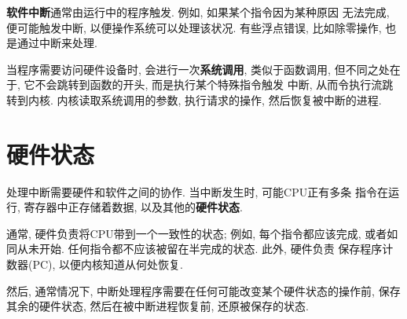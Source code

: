 \documentclass[12pt]{book}
\begin{document}
{%
{\bf 软件中断}通常由运行中的程序触发. 例如, 如果某个指令因为某种原因
无法完成, 便可能触发中断, 以便操作系统可以处理该状况. 有些浮点错误, 
比如除零操作, 也是通过中断来处理. 

当程序需要访问硬件设备时, 会进行一次{\bf 系统调用}, 类似于函数调用, 
但不同之处在于, 它不会跳转到函数的开头, 而是执行某个特殊指令触发
中断, 从而令执行流跳转到内核. 内核读取系统调用的参数, 执行请求的操作, 
然后恢复被中断的进程.


\section{硬件状态}

处理中断需要硬件和软件之间的协作. 当中断发生时, 可能CPU正有多条
指令在运行, 寄存器中正存储着数据, 以及其他的{\bf 硬件状态}.

通常, 硬件负责将CPU带到一个一致性的状态; 例如, 每个指令都应该完成, 
或者如同从未开始. 任何指令都不应该被留在半完成的状态. 此外, 硬件负责
保存程序计数器(PC), 以便内核知道从何处恢复. 

然后, 通常情况下, 中断处理程序需要在任何可能改变某个硬件状态的操作前, 
保存其余的硬件状态, 然后在被中断进程恢复前, 还原被保存的状态. 

}
\end{document}

